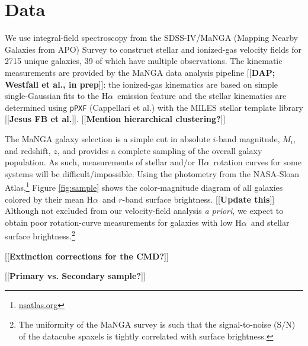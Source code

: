\documentclass[apj,iop,revtex4,numberedappendix]{emulateapj}
\newcommand{\comment}[2][todo]{{\color{#1}[[{\bf #2}]]}}
\newcommand{\halpha}{H$\alpha$}
\begin{document}
\section{Data}
\label{sec:data}

We use integral-field spectroscopy from the SDSS-IV/MaNGA (Mapping
Nearby Galaxies from APO) Survey to construct stellar and ionized-gas
velocity fields for 2715 unique galaxies, 39 of which have multiple
observations.  The kinematic measurements are provided by the MaNGA data
analysis pipeline \comment{DAP; Westfall et al., in prep}: the
ionized-gas kinematics are based on simple single-Gaussian fits to the
\halpha\ emission feature and the stellar kinematics are determined
using {\tt pPXF} (Cappellari et al.) with the MILES stellar template
library \comment{Jesus FB et al.}.  \comment{Mention hierarchical
clustering?}

The MaNGA galaxy selection \citep{2017AJ....154...86W} is a simple cut
in absolute $i$-band magnitude, $M_i$, and redshift, $z$, and provides a
complete sampling of the overall galaxy population.  As such,
measurements of stellar and/or \halpha\ rotation curves for some systems
will be difficult/impossible.  Using the photometry from the NASA-Sloan
Atlas,\footnote{\url{nsatlas.org}} Figure \ref{fig:sample} shows the
color-magnitude diagram of all galaxies colored by their mean \halpha\
and $r$-band surface brightness.  \comment{Update this} Although not
excluded from our velocity-field analysis {\em a priori}, we expect to
obtain poor rotation-curve measurements for galaxies with low \halpha\
and stellar surface brightness.\footnote{
%
The uniformity of the MaNGA survey \citet{2015AJ....150...19L} is such
that the signal-to-noise (S/N) of the datacube spaxels is tightly
correlated with surface brightness.}

\comment{Extinction corrections for the CMD?}

\comment{Primary vs. Secondary sample?}
\end{document}
